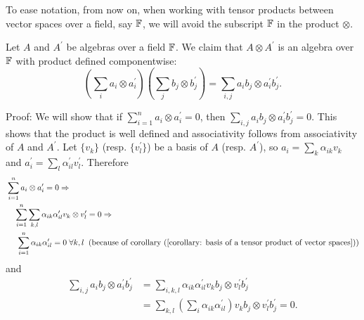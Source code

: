\begin{notation}
    To ease notation, from now on, when working with tensor products between vector spaces over a field, say $\mathbb{F}$, we will avoid the subscript $\mathbb{F}$ in the product $\otimes$. 
\end{notation}
\begin{dang}
    \begin{theorem}\label{theorem: tensor of product of algebras is a tensor product}\cite{curtis1966representation}
        Let $A$ and $A^\prime$ be algebras over a field $\mathbb{F}$. We claim that $A\otimes A^\prime$ is an algebra over $\mathbb{F}$ with product defined componentwise:
        \begin{equation}
            \left(\sum_ia_i\otimes a_i^\prime\right)\left(\sum_j b_j\otimes b_j^\prime\right)=\sum_{i,j}a_ib_j\otimes a_i^\prime b_j^\prime.
        \end{equation}
    \end{theorem}
\end{dang}
Proof: We will show that if $\sum_{i=1}^na_i\otimes a_i^\prime=0$, then $\sum_{i,j}a_ib_j\otimes a_i^\prime b_j^\prime=0$. This shows that the product is well defined and associativity follows from associativity of $A$ and $A^\prime$. Let $\{v_k\}$ (resp. $\{v_l^\prime\}$)  be a basis of $A$ (resp. $A^\prime$), so $a_i=\sum_k\alpha_{ik}v_k$ and $a_i^\prime=\sum_l\alpha_{il}^\prime v_l^\prime$. Therefore
\begin{equation}
    \begin{split}
        &\sum_{i=1}^n a_i\otimes a_i^\prime=0\Rightarrow\\
        &\quad\sum_{i=1}^n\sum_{k,l}\alpha_{ik}\alpha_{il}^\prime v_{k}\otimes v_l^\prime = 0\Rightarrow\\
        &\quad\;\sum_{i=1}^n\alpha_{ik}\alpha_{il}^\prime=0\;\forall k,l\;\;(\text{because of corollary~(\ref{corollary: basis of a tensor product of vector spaces})})
    \end{split}
\end{equation}
and
\begin{equation}
    \begin{split}
        \sum_{i,j}a_ib_j\otimes a_i^\prime b_j^\prime &= \sum_{i,k,l}\alpha_{ik}\alpha_{il}^\prime v_kb_j\otimes v_l^\prime b_j^\prime\\
        &=\sum_{k,l}\left(\sum_{i}\alpha_{ik}\alpha_{il}^\prime\right) v_kb_j\otimes v_l^\prime b_j^\prime=0.
    \end{split}
\end{equation}
